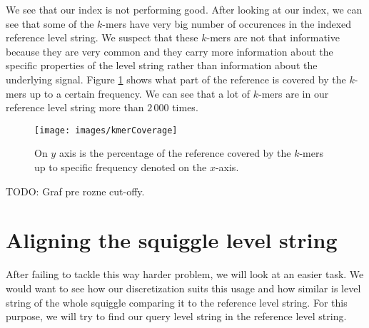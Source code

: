 We see that our index is not performing good. After looking at our index, we can
see that some of the $k$-mers have very big number of occurences in the indexed
reference level string. We suspect that these $k$-mers are not that informative
because they are very common and they carry more information about the specific
properties of the level string rather than information about the underlying signal.
Figure \ref{obr:kmerCoverage} shows what part of the reference is covered by the $k$-mers
up to a certain frequency. We can see that a lot of $k$-mers are in our reference
level string more than $2\,000$ times.

\begin{figure}
\centerline{\texttt{[image: images/kmerCoverage]}}
\caption[TODO]{On $y$ axis is the percentage of the reference covered by the $k$-mers up to specific frequency
denoted on the $x$-axis.}
\label{obr:kmerCoverage}
\end{figure}

TODO: Graf pre rozne cut-offy.

\section{Aligning the squiggle level string}
\label{section:alignMinimap}

After failing to tackle this way harder problem, we will look at an easier task. We would want to see how
our discretization suits this usage and how similar is level string of the whole squiggle
comparing it to the reference level string. For this purpose, we will try to
find our query level string in the reference level string.

